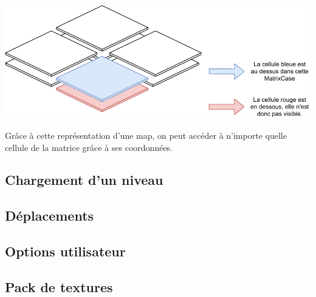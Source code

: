 \documentclass[../main.tex]{subfiles}
\begin{document}
\includegraphics[width=1\textwidth,clip]{images/matrixCase.pdf}

Grâce à cette représentation d'une map, on peut accéder à n'importe quelle cellule de la matrice grâce à ses coordonnées.

\subsection{Chargement d'un niveau}

\subsection{Déplacements}

\subsection{Options utilisateur}

\subsection{Pack de textures}
\end{document}
